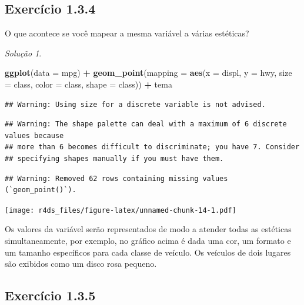 \documentclass[
]{latex/krantz}
\newenvironment{Shaded}{\begin{snugshade}}{\end{snugshade}}
\newcommand{\AttributeTok}[1]{\textcolor[rgb]{0.13,0.29,0.53}{#1}}
\newcommand{\FunctionTok}[1]{\textcolor[rgb]{0.13,0.29,0.53}{\textbf{#1}}}
\newcommand{\NormalTok}[1]{#1}
\newcommand{\SpecialCharTok}[1]{\textcolor[rgb]{0.81,0.36,0.00}{\textbf{#1}}}
\theoremstyle{definition}
\theoremstyle{definition}
\theoremstyle{definition}
\theoremstyle{definition}
\theoremstyle{remark}
\newtheorem*{solution}{Solução}
\begin{document}
\hypertarget{exr1-3-4}{%
\subsection*{Exercício 1.3.4}\label{exr1-3-4}}

O que acontece se você mapear a mesma variável a várias estéticas?

\begin{solution}
\leavevmode

\begin{Shaded}
\begin{Highlighting}[]
\FunctionTok{ggplot}\NormalTok{(}\AttributeTok{data =}\NormalTok{ mpg) }\SpecialCharTok{+}
    \FunctionTok{geom\_point}\NormalTok{(}\AttributeTok{mapping =} \FunctionTok{aes}\NormalTok{(}\AttributeTok{x =}\NormalTok{ displ, }\AttributeTok{y =}\NormalTok{ hwy, }\AttributeTok{size =}\NormalTok{ class, }\AttributeTok{color =}\NormalTok{ class, }\AttributeTok{shape =}\NormalTok{ class)) }\SpecialCharTok{+}
\NormalTok{    tema}
\end{Highlighting}
\end{Shaded}

\begin{verbatim}
## Warning: Using size for a discrete variable is not advised.
\end{verbatim}

\begin{verbatim}
## Warning: The shape palette can deal with a maximum of 6 discrete values because
## more than 6 becomes difficult to discriminate; you have 7. Consider
## specifying shapes manually if you must have them.
\end{verbatim}

\begin{verbatim}
## Warning: Removed 62 rows containing missing values (`geom_point()`).
\end{verbatim}

\texttt{[image: r4ds\_files/figure-latex/unnamed-chunk-14-1.pdf]}

Os valores da variável serão representados de modo a atender todas as estéticas simultaneamente, por exemplo, no gráfico acima é dada uma cor, um formato e um tamanho específicos para cada classe de veículo. Os veículos de dois lugares são exibidos como um disco rosa pequeno.

\end{solution}

\hypertarget{exr1-3-5}{%
\subsection*{Exercício 1.3.5}\label{exr1-3-5}}
\end{document}

